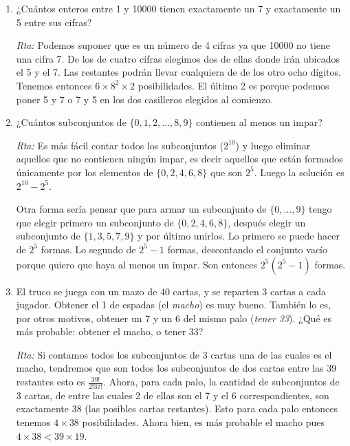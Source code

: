 \documentclass[a4paper,12pt,twoside,spanish,reqno]{amsbook}
\numberwithin{equation}{section}
\begin{document}
\begin{enumerate}
\medskip

\item ¿Cuántos enteros entre 1 y 10000 tienen exactamente un 7 y exactamente un 5
entre sus cifras?

\noindent\textit{Rta:} Podemos suponer que es un número de 4 cifras ya que 10000 no tiene una cifra 7.
De los de cuatro cifras elegimos dos de ellas donde irán ubicados el 5 y el 7. Las restantes podrán llevar cualquiera de de los otro ocho dígitos. Tenemos entonces $6\times 8^2\times 2$ posibilidades. El último 2 es porque podemos poner 5 y 7 o 7 y 5 en los dos casilleros elegidos al comienzo.

\medskip

\item ¿Cuántos subconjuntos de $\{0,1,2,\dots,8,9\}$ contienen al menos un impar?

\noindent\textit{Rta:} Es más fácil contar todos los subconjuntos ($2^{10}$) y luego eliminar aquellos que no contienen ningún impar, es decir aquellos que están formados únicamente por los elementos de $\{0,2,4,6,8\}$ que son $2^5$. Luego la solución es $2^{10}-2^5$.

Otra forma sería pensar que para armar un subconjunto de $\{0,...,9\}$ tengo que elegir primero un subconjunto de $\{0,2,4,6,8\}$, después elegir un subconjunto de $\{1,3,5,7,9\}$ y por último unirlos. Lo primero se puede hacer de $2^5$ formas. Lo segundo de $2^5-1$ formas, descontando el conjunto vacío porque quiero que haya al menos un impar. Son entonces $2^5 (2^5 - 1)$ formas.

\medskip

\item El truco se juega con un mazo de 40 cartas, y se reparten 3 cartas a cada jugador. Obtener el 1 de espadas (el {\it macho}) es muy bueno. También lo es, por otros motivos, obtener un 7 y un 6 del mismo palo ({\it tener 33}). ¿Qué es más probable: obtener el macho, o tener 33?

\noindent\textit{Rta:} Si contamos todos los subconjuntos de 3 cartas una de las cuales es el macho, tendremos que son todos los subconjuntos de dos cartas entre las 39 restantes esto es $\frac{39!}{2!37!}$.
Ahora, para cada palo, la cantidad de subconjuntos de 3 cartas, de entre las cuales 2 de ellas son el 7 y el 6 correspondientes, son exactamente 38 (las posibles cartas restantes). Esto para cada palo entonces tenemos $4\times 38$ posibilidades. Ahora bien, es más probable el macho pues $4\times 38< 39\times 19$. 

\medskip


\end{enumerate}
\end{document}
